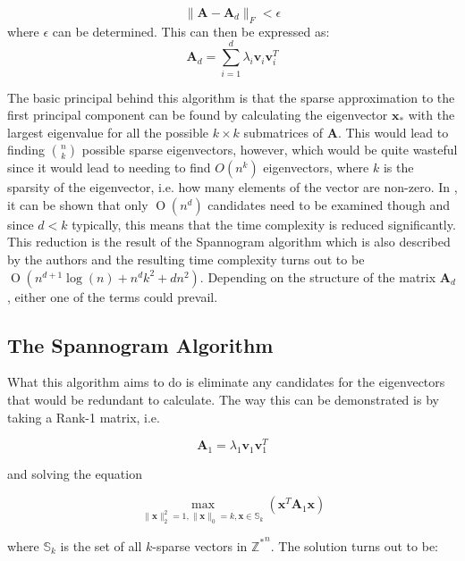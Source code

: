 \documentclass[graybox]{svmult}
\newcommand{\covmat}{\mathbf{A}}
\newcommand{\BigO}[1]{\ensuremath{\operatorname{O}\left(#1\right)}}
\begin{document}
\begin{equation*}
\|\mathbf{A} - \mathbf{A}_d\|_F < \epsilon
\end{equation*}
where $\epsilon$ can be determined. This can then be expressed as:
\begin{equation*}
\mathbf{A}_d = \sum_{i=1}^d \lambda_i \mathbf{v}_i \mathbf{v}_i^T
\end{equation*}

The basic principal behind this algorithm is that the sparse approximation to the first principal component can be found by calculating the eigenvector $\mathbf{x}_*$ with the largest eigenvalue for all the possible $k\times k$ submatrices of $\mathbf{A}$. This would lead to finding $n \choose k$ possible sparse eigenvectors, however, which would be quite wasteful since it would lead to needing to find $O\left( n^k\right)$ eigenvectors, where $k$ is the sparsity of the eigenvector, i.e. how many elements of the vector are non-zero. In \cite{dimakis}, it can be shown that only $\BigO {n^d}$ candidates need to be examined though and since $d < k$ typically, this means that the time complexity is reduced significantly. This reduction is the result of the Spannogram algorithm which is also described by the authors and the resulting time complexity turns out to be $\BigO { n^{d+1}\log(n) + n^d k^2 + dn^2}$. Depending on the structure of the matrix $\covmat_d$, either one of the terms could prevail.

\subsection{The Spannogram Algorithm}

What this algorithm aims to do is eliminate any candidates for the eigenvectors that would be redundant to calculate. The way this can be demonstrated is by taking a Rank-1 matrix, i.e.

\begin{equation*}
\mathbf{A}_1 = \lambda_1 \mathbf{v}_1 \mathbf{v}_1^T
\end{equation*}

and solving the equation

\begin{equation*}
 \underset{\|\mathbf{x}\|_2^2 = 1, \|\mathbf{x}\|_0 = k, \mathbf{x} \in\mathbb{S}_k} \max( \mathbf{x}^T\mathbf{A}_1\mathbf{x})
\end{equation*}

where $\mathbb{S}_k$ is the set of all $k$-sparse vectors in $\mathbb{Z^*}^n$. The solution turns out to be:
\end{document}
